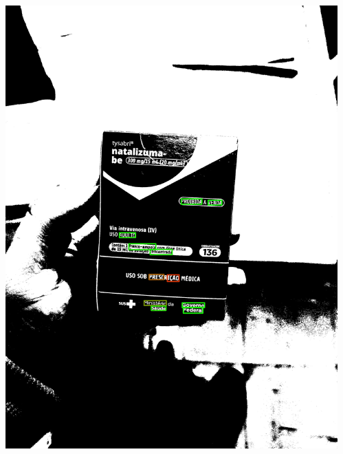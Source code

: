 \begin{frame}
\begin{columns}
\begin{column}{0.24\textwidth}
			\includegraphics[height=0.35\textheight]{../pictures/tysabri_g_thresh_recomposed_cmyk_boxes.jpg}
		\end{column}
		\begin{column}{0.24\textwidth}\centering

\end{column}
\end{columns}
\end{frame}
